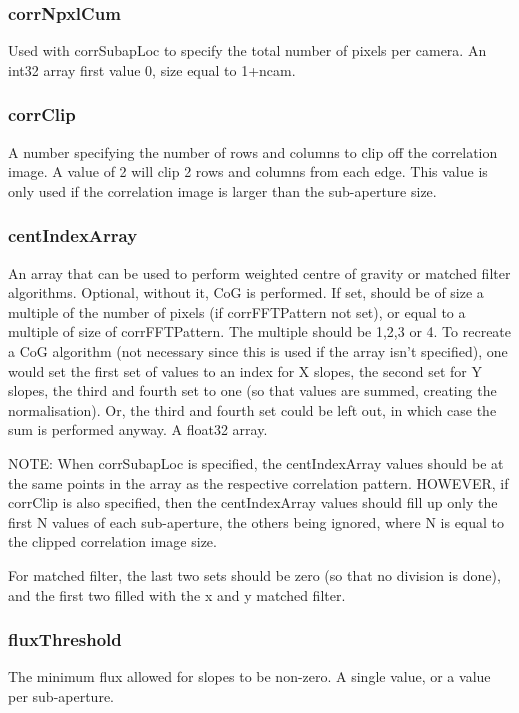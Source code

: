 \documentclass[a4,10pt]{article}
\begin{document}
\subsubsection{corrNpxlCum}
Used with corrSubapLoc to specify the total number of pixels per
camera.  An int32 array first value 0, size equal to 1+ncam.

\subsubsection{corrClip}
A number specifying the number of rows and columns to clip off the
correlation image.  A value of 2 will clip 2 rows and columns from
each edge.  This value is only used if the correlation image is larger
than the sub-aperture size.

\subsubsection{centIndexArray}
An array that can be used to perform weighted centre of gravity or
matched filter algorithms.  Optional, without it, CoG is performed.
If set, should be of size a multiple of the number of pixels (if
corrFFTPattern not set), or equal to a multiple of size of
corrFFTPattern.  The multiple should be 1,2,3 or 4.  To recreate a CoG
algorithm (not necessary since this is used if the array isn't
specified), one would set the first set of
values to an index for X slopes, the second set for Y slopes, the
third and fourth set to one (so that values are summed, creating the
normalisation).  Or, the third and fourth set could be left out, in
which case the sum is performed anyway.  A float32 array.

NOTE:  When corrSubapLoc is specified, the centIndexArray values
should be at the same points in the array as the respective
correlation pattern.  HOWEVER, if corrClip is also specified, then the
centIndexArray values should fill up only the first N values of each
sub-aperture, the others being ignored, where N is equal to the
clipped correlation image size.

For matched filter, the last two sets should be zero (so that no
division is done), and the first two filled with the x and y matched filter.


\subsubsection{fluxThreshold}
The minimum flux allowed for slopes to be non-zero.  A single value,
or a value per sub-aperture.
\end{document}
